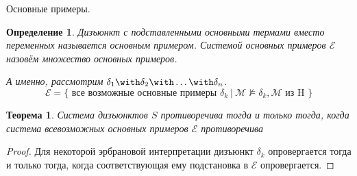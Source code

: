 \documentclass[handout]{beamer}
\newtheorem{thm}{Теорема}[section]
\newtheorem{dfn}{Определение}[section]
\newtheorem{exm}{Пример}[section]
\begin{document}
\begin{frame}{Основные примеры.}
\begin{dfn}
Дизъюнкт с подставленными основными термами вместо переменных называется основным примером.
Системой основных примеров $\mathcal{E}$ назовём множество основных примеров.

А именно, рассмотрим $\delta_1\with\delta_2\with\dots\with\delta_n$. 
$$\mathcal{E} = \{ \text{ все возможные основные примеры }\delta_k\ |\ \mathcal{M} \not\models \delta_k, \mathcal{M}\text{ из H }\}$$
\end{dfn}\vspace{-0.5cm}
\begin{thm}Система дизъюнктов $S$ противоречива тогда и только тогда, когда система всевозможных
основных примеров $\mathcal{E}$ противоречива\end{thm}
\begin{proof}Для некоторой эрбрановой интерпретации дизъюнкт $\delta_k$
опровергается тогда и только тогда, когда соответствующая ему подстановка в $\mathcal{E}$ опровергается.
\end{proof}\end{frame}

\begin{comment}
\begin{frame}{Компактность}
\begin{dfn} 
Пространство $X$ компактно, если из любого его открытого покрытия $U$ можно выделить конечное подпокрытие:

$X = \cup U$, существует $V \subseteq U$, что $|V| < \aleph_0$ и $X = \cup V$.
\end{dfn}

\begin{exm}
$(0,1)$ не компактен. Например, $U = \{(\varepsilon/2,\varepsilon)\ |\ \varepsilon\in(0,1)\}$.
Пусть $V \subset U$ и $|V| < \aleph_0$. Тогда $\min \{ a\ |\ (a,b) \in V \} > 0$.
\end{exm}

\begin{exm}
$[0,1]$ компактен. Выберем $U$ и покажем, что в нём есть подпокрытие.
Рассмотрим все подотрезки вида $[a,x]$ где $a < x$, имеющие конечное покрытие.
Несложно показать, что $\max x = 1$.
\end{exm}
\end{frame}
\end{comment}
\end{document}
